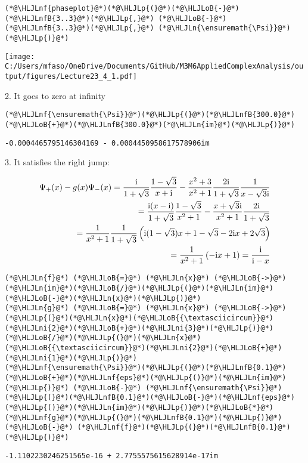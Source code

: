 \documentclass[12pt,landscape]{article}
\newcommand{\HLJLn}[1]{#1}
\newcommand{\HLJLnf}[1]{\textcolor[RGB]{66,102,213}{#1}}
\newcommand{\HLJLnfB}[1]{\textcolor[RGB]{59,151,46}{#1}}
\newcommand{\HLJLni}[1]{\textcolor[RGB]{59,151,46}{#1}}
\newcommand{\HLJLoB}[1]{\textcolor[RGB]{102,102,102}{\textbf{#1}}}
\newcommand{\HLJLp}[1]{#1}
\def\I{ {\rm i} }
\begin{document}
{\begin{lstlisting}
(*@\HLJLnf{phaseplot}@*)(*@\HLJLp{(}@*)(*@\HLJLoB{-}@*)(*@\HLJLnfB{3..3}@*)(*@\HLJLp{,}@*) (*@\HLJLoB{-}@*)(*@\HLJLnfB{3..3}@*)(*@\HLJLp{,}@*) (*@\HLJLn{\ensuremath{\Psi}}@*)(*@\HLJLp{)}@*)
\end{lstlisting}

\texttt{[image: C:/Users/mfaso/OneDrive/Documents/GitHub/M3M6AppliedComplexAnalysis/output/figures/Lecture23\_4\_1.pdf]}

2. It goes to zero at infinity


\begin{lstlisting}
(*@\HLJLnf{\ensuremath{\Psi}}@*)(*@\HLJLp{(}@*)(*@\HLJLnfB{300.0}@*)(*@\HLJLoB{+}@*)(*@\HLJLnfB{300.0}@*)(*@\HLJLn{im}@*)(*@\HLJLp{)}@*)
\end{lstlisting}

\begin{lstlisting}
-0.0004465795146304169 - 0.0004450958617578906im
\end{lstlisting}


3. It satisfies the right jump:


\begin{align*}
 \Psi_+(x) - g(x) \Psi_-(x) = {\I \over 1+\sqrt 3} {1-\sqrt 3 \over x+\I}  - {x^2 + 3 \over x^2 + 1}
{2 \I  \over 1+ \sqrt{3}} {1 \over x-\sqrt{3}\I}  \\
 = {\I (x-\I) \over 1+\sqrt 3} {1-\sqrt 3 \over x^2+1}  - {x + \sqrt{3} \I \over x^2 + 1}
{2 \I  \over 1+ \sqrt{3}}  \\
= {1\over x^2 + 1}
{1 \over 1+ \sqrt{3}}  \left(\I(1-\sqrt 3) x+1-\sqrt{3}  - 2\I x + 2 \sqrt{3}    \right) \\
= {1\over x^2 + 1}
 \left(-\I x+1    \right) = {\I \over \I - x}
\end{align*}

\begin{lstlisting}
(*@\HLJLn{f}@*) (*@\HLJLoB{=}@*) (*@\HLJLn{x}@*) (*@\HLJLoB{->}@*) (*@\HLJLn{im}@*)(*@\HLJLoB{/}@*)(*@\HLJLp{(}@*)(*@\HLJLn{im}@*)(*@\HLJLoB{-}@*)(*@\HLJLn{x}@*)(*@\HLJLp{)}@*)
(*@\HLJLn{g}@*) (*@\HLJLoB{=}@*) (*@\HLJLn{x}@*) (*@\HLJLoB{->}@*) (*@\HLJLp{(}@*)(*@\HLJLn{x}@*)(*@\HLJLoB{{\textasciicircum}}@*)(*@\HLJLni{2}@*)(*@\HLJLoB{+}@*)(*@\HLJLni{3}@*)(*@\HLJLp{)}@*)(*@\HLJLoB{/}@*)(*@\HLJLp{(}@*)(*@\HLJLn{x}@*)(*@\HLJLoB{{\textasciicircum}}@*)(*@\HLJLni{2}@*)(*@\HLJLoB{+}@*)(*@\HLJLni{1}@*)(*@\HLJLp{)}@*)
(*@\HLJLnf{\ensuremath{\Psi}}@*)(*@\HLJLp{(}@*)(*@\HLJLnfB{0.1}@*)(*@\HLJLoB{+}@*)(*@\HLJLnf{eps}@*)(*@\HLJLp{()}@*)(*@\HLJLn{im}@*)(*@\HLJLp{)}@*) (*@\HLJLoB{-}@*) (*@\HLJLnf{\ensuremath{\Psi}}@*)(*@\HLJLp{(}@*)(*@\HLJLnfB{0.1}@*)(*@\HLJLoB{-}@*)(*@\HLJLnf{eps}@*)(*@\HLJLp{()}@*)(*@\HLJLn{im}@*)(*@\HLJLp{)}@*)(*@\HLJLoB{*}@*)(*@\HLJLnf{g}@*)(*@\HLJLp{(}@*)(*@\HLJLnfB{0.1}@*)(*@\HLJLp{)}@*) (*@\HLJLoB{-}@*) (*@\HLJLnf{f}@*)(*@\HLJLp{(}@*)(*@\HLJLnfB{0.1}@*)(*@\HLJLp{)}@*)
\end{lstlisting}

\begin{lstlisting}
-1.1102230246251565e-16 + 2.7755575615628914e-17im
\end{lstlisting}


}
\end{document}
